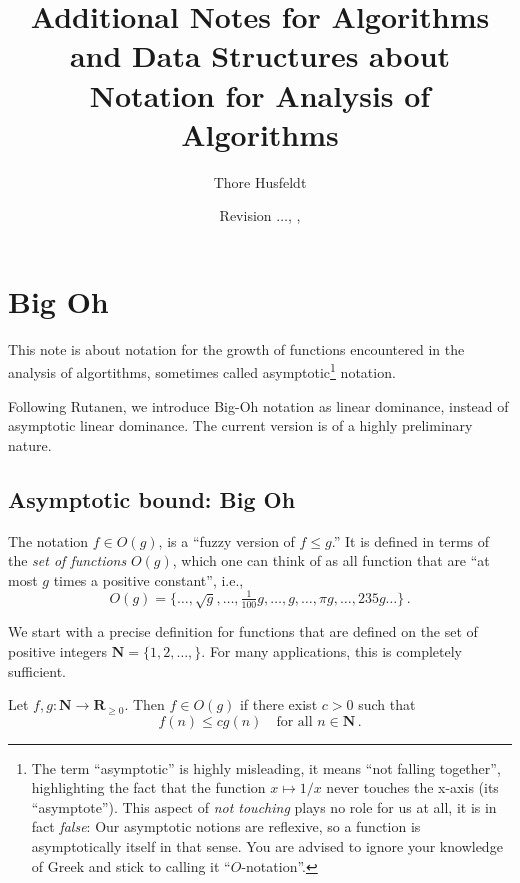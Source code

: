 \documentclass{tstextbook}
\title{Additional Notes for Algorithms and Data Structures about Notation for Analysis of Algorithms}
\author{Thore Husfeldt}
\date{\small Revision {\tt \GITAbrHash}$\ldots$, \GITAuthorDate, \GITAuthorName}
\begin{document}
\maketitle

\chapter{Big Oh}


\begin{summary}
This note is about notation for the growth of functions encountered in the analysis of algortithms, sometimes called asymptotic\footnote{%
  The term “asymptotic” is highly misleading, it means “not falling together”, highlighting the fact that the function \(x\mapsto 1/x\) never touches the x-axis (its “asymptote”).
  This aspect of \emph{not touching} plays no role for us at all, it is in fact \emph{false}: 
  Our asymptotic notions are reflexive, so a function is asymptotically itself in that sense.
  You are advised to ignore your knowledge of Greek and stick to calling it ``$O$-notation''.}
notation.

Following Rutanen, we introduce Big-Oh notation as linear dominance, instead of asymptotic linear dominance.
The current version is of a highly preliminary nature.
\end{summary}


\section{Asymptotic bound: Big Oh}

The notation \(f\in O(g) \), is a “fuzzy version of \(f\leq g\).”
It is defined in terms of the \emph{set of functions} $O(g)$, which one can think of as all function that are ``at most $g$ times a positive constant'', i.e., 
\[ O(g) = \{ \ldots, \sqrt{g}, \ldots, \tfrac{1}{100}g,  \ldots,g, \ldots,\pi g, \ldots,235g\ldots\}\,.\]

We start with a precise definition for functions that are defined on the set of positive integers $\mathbf N =\{1,2,\ldots, \}$.
For many applications, this is completely sufficient.

\begin{definition}
  \label{def:Omonovariate}
  Let $f, g\colon \mathbf N\rightarrow\mathbf R_{\geq 0}$.
  Then $f \in O(g)$ if there exist $c>0$ such that
  \[ f(n)\leq cg(n)\quad\text{for all $n\in \mathbf N$}\,. \]
\end{definition}
\end{document}
